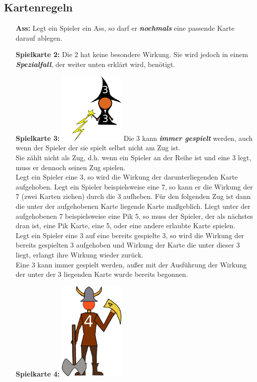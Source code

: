 \documentclass{article}
\begin{document}
\subsection*{Kartenregeln}       
\begin{itemize}
\item[\textbf{Ass:}] Legt ein Spieler ein Ass, so darf er \textit{\textbf{nochmals}} eine passende Karte darauf ablegen. 
\item[ \textbf{Spielkarte 2:}] Die 2 hat keine besondere Wirkung. Sie wird jedoch in einem \textit{\textbf{Spezialfall}}, der weiter unten erklärt wird, benötigt.
\item[\textbf{Spielkarte 3:}]
\includegraphics[width=0.25\textwidth]{photos/wizard.png}
Die 3 kann \textit{\textbf{immer gespielt}} werden, auch wenn der Spieler der sie spielt selbst nicht am Zug ist. \\ Sie zählt nicht als Zug, d.h. wenn ein Spieler an der Reihe ist und eine 3 legt, muss er dennoch seinen Zug spielen. \\
Legt ein Spieler eine 3, so wird die Wirkung der darunterliegenden Karte aufgehoben. Legt ein Spieler beispielsweise eine 7, so kann er die Wirkung der 7 (zwei Karten ziehen) durch die 3 aufheben. Für den folgenden Zug ist dann die
unter der aufgehobenen Karte liegende Karte maßgeblich. Liegt unter der aufgehobenen 7 beispielsweise eine Pik 5, so muss der Spieler, der als nächstes dran ist, eine Pik Karte, eine 5, oder eine andere erlaubte Karte spielen. \\
Legt ein Spieler eine 3 auf eine bereits gespielte 3, so wird die Wirkung der bereits gespielten 3 aufgehoben und Wirkung der Karte die unter dieser 3 liegt, erlangt ihre Wirkung wieder zurück. \\ Eine 3 kann immer gespielt werden, außer mit der Ausführung der Wirkung der unter der 3 liegenden Karte wurde bereits begonnen.
\item[\textbf{Spielkarte 4:}]
\includegraphics[width=0.25\textwidth]{photos/viking.png}

\end{itemize}
\end{document}

